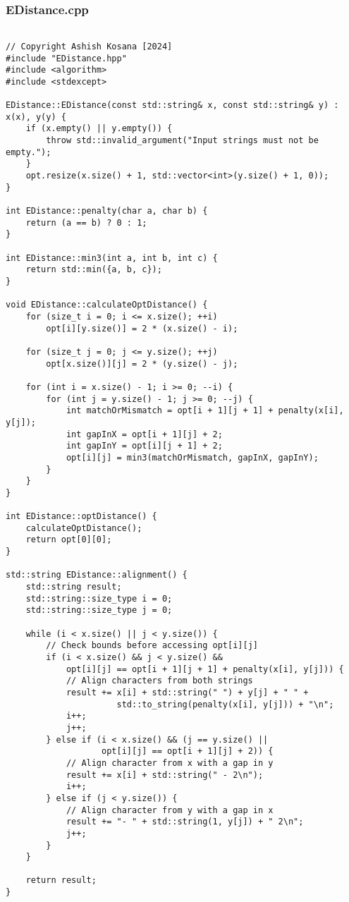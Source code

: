 \documentclass[12pt]{article}
\begin{document}
\subsubsection{EDistance.cpp}
\begin{lstlisting}[style=cppcode]

// Copyright Ashish Kosana [2024]
#include "EDistance.hpp"
#include <algorithm>
#include <stdexcept>

EDistance::EDistance(const std::string& x, const std::string& y) : x(x), y(y) {
    if (x.empty() || y.empty()) {
        throw std::invalid_argument("Input strings must not be empty.");
    }
    opt.resize(x.size() + 1, std::vector<int>(y.size() + 1, 0));
}

int EDistance::penalty(char a, char b) {
    return (a == b) ? 0 : 1;
}

int EDistance::min3(int a, int b, int c) {
    return std::min({a, b, c});
}

void EDistance::calculateOptDistance() {
    for (size_t i = 0; i <= x.size(); ++i)
        opt[i][y.size()] = 2 * (x.size() - i);

    for (size_t j = 0; j <= y.size(); ++j)
        opt[x.size()][j] = 2 * (y.size() - j);

    for (int i = x.size() - 1; i >= 0; --i) {
        for (int j = y.size() - 1; j >= 0; --j) {
            int matchOrMismatch = opt[i + 1][j + 1] + penalty(x[i], y[j]);
            int gapInX = opt[i + 1][j] + 2;
            int gapInY = opt[i][j + 1] + 2;
            opt[i][j] = min3(matchOrMismatch, gapInX, gapInY);
        }
    }
}

int EDistance::optDistance() {
    calculateOptDistance();
    return opt[0][0];
}

std::string EDistance::alignment() {
    std::string result;
    std::string::size_type i = 0;
    std::string::size_type j = 0;

    while (i < x.size() || j < y.size()) {
        // Check bounds before accessing opt[i][j]
        if (i < x.size() && j < y.size() &&
            opt[i][j] == opt[i + 1][j + 1] + penalty(x[i], y[j])) {
            // Align characters from both strings
            result += x[i] + std::string(" ") + y[j] + " " +
                      std::to_string(penalty(x[i], y[j])) + "\n";
            i++;
            j++;
        } else if (i < x.size() && (j == y.size() ||
                   opt[i][j] == opt[i + 1][j] + 2)) {
            // Align character from x with a gap in y
            result += x[i] + std::string(" - 2\n");
            i++;
        } else if (j < y.size()) {
            // Align character from y with a gap in x
            result += "- " + std::string(1, y[j]) + " 2\n";
            j++;
        }
    }

    return result;
}

\end{lstlisting}
\end{document}
